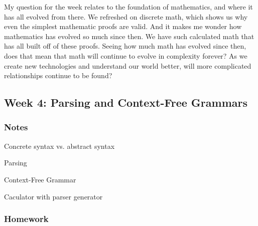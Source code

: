 \documentclass{article}
\theoremstyle{theorem}
\theoremstyle{definition}
\theoremstyle{remark}
\begin{document}
My question for the week relates to the foundation of mathematics, and where it has all evolved from there. We refreshed on discrete math,
which shows us why even the simplest mathematic proofs are valid. And it makes me wonder how mathematics has evolved so much since then. We have
such calculated math that has all built off of these proofs. Seeing how much math has evolved since then, does that mean that math will continue to
evolve in complexity forever? As we create new technologies and understand our world better, will more complicated relationships continue to be found?


\subsection{Week 4: Parsing and Context-Free Grammars}
\subsubsection*{Notes}
Concrete syntax vs. abstract syntax

Parsing

Context-Free Grammar

Caculator with parser generator
\subsubsection*{Homework}
\end{document}
